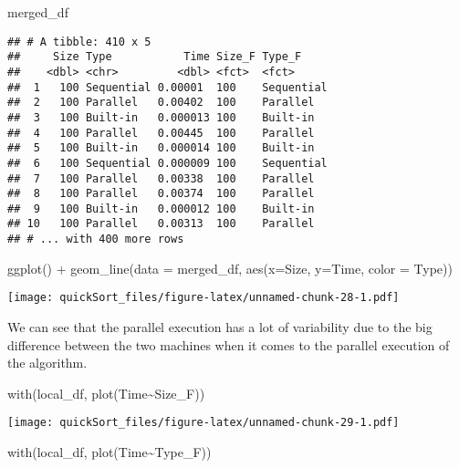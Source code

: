 \documentclass[
]{article}
\newenvironment{Shaded}{\begin{snugshade}}{\end{snugshade}}
\newcommand{\AttributeTok}[1]{\textcolor[rgb]{0.77,0.63,0.00}{#1}}
\newcommand{\FunctionTok}[1]{\textcolor[rgb]{0.00,0.00,0.00}{#1}}
\newcommand{\NormalTok}[1]{#1}
\newcommand{\SpecialCharTok}[1]{\textcolor[rgb]{0.00,0.00,0.00}{#1}}
\begin{document}
\begin{Shaded}
\begin{Highlighting}[]
\NormalTok{merged\_df}
\end{Highlighting}
\end{Shaded}

\begin{verbatim}
## # A tibble: 410 x 5
##     Size Type           Time Size_F Type_F    
##    <dbl> <chr>         <dbl> <fct>  <fct>     
##  1   100 Sequential 0.00001  100    Sequential
##  2   100 Parallel   0.00402  100    Parallel  
##  3   100 Built-in   0.000013 100    Built-in  
##  4   100 Parallel   0.00445  100    Parallel  
##  5   100 Built-in   0.000014 100    Built-in  
##  6   100 Sequential 0.000009 100    Sequential
##  7   100 Parallel   0.00338  100    Parallel  
##  8   100 Parallel   0.00374  100    Parallel  
##  9   100 Built-in   0.000012 100    Built-in  
## 10   100 Parallel   0.00313  100    Parallel  
## # ... with 400 more rows
\end{verbatim}

\begin{Shaded}
\begin{Highlighting}[]
\FunctionTok{ggplot}\NormalTok{() }\SpecialCharTok{+}               
  \FunctionTok{geom\_line}\NormalTok{(}\AttributeTok{data =}\NormalTok{ merged\_df, }\FunctionTok{aes}\NormalTok{(}\AttributeTok{x=}\NormalTok{Size, }\AttributeTok{y=}\NormalTok{Time, }\AttributeTok{color =}\NormalTok{ Type))}
\end{Highlighting}
\end{Shaded}

\texttt{[image: quickSort\_files/figure-latex/unnamed-chunk-28-1.pdf]}

We can see that the parallel execution has a lot of variability due to
the big difference between the two machines when it comes to the
parallel execution of the algorithm.

\begin{Shaded}
\begin{Highlighting}[]
\FunctionTok{with}\NormalTok{(local\_df, }\FunctionTok{plot}\NormalTok{(Time}\SpecialCharTok{\textasciitilde{}}\NormalTok{Size\_F))}
\end{Highlighting}
\end{Shaded}

\texttt{[image: quickSort\_files/figure-latex/unnamed-chunk-29-1.pdf]}

\begin{Shaded}
\begin{Highlighting}[]
\FunctionTok{with}\NormalTok{(local\_df, }\FunctionTok{plot}\NormalTok{(Time}\SpecialCharTok{\textasciitilde{}}\NormalTok{Type\_F))}
\end{Highlighting}
\end{Shaded}
\end{document}
